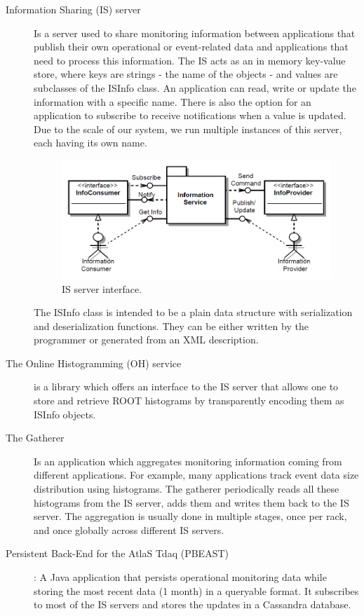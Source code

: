 \begin{description}
\item[Information Sharing (IS) server \citep{kolosinformation}]  Is a server used to share monitoring information between applications that publish their own operational or event-related data and applications that need to process this information. The IS acts as an in memory key-value store, where keys are strings - the name of the objects - and values are subclasses of the ISInfo class. An application can read, write or update the information with a specific name. There is also the option for an application to subscribe to receive notifications when a value is updated. Due to the scale of our system, we run multiple instances of this server, each having its own name.

\begin{figure}[ht!]
\centering
\includegraphics[scale=0.44]{Images/IS.png}
\caption{IS server interface.}
\end{figure}


The ISInfo class is intended to be a plain data structure with serialization and deserialization functions. They can be either written by the programmer or generated from an XML description.

\item[The Online Histogramming (OH) service \citep{kolosoh}] is a library which offers an interface to the IS server that allows one to store and retrieve ROOT histograms by transparently encoding them as ISInfo objects.

\item[The Gatherer \citep{renkel2010gatherer}] Is an application which aggregates monitoring information coming from different applications. For example, many applications track event data size distribution using histograms. The gatherer periodically reads all these histograms from the IS server, adds them and writes them back to the IS server. The aggregation is usually done in multiple stages, once per rack, and once globally across different IS servers. 

\item[Persistent Back-End for the AtlaS Tdaq (PBEAST) \citep{sicoe2012persistent}]: A Java application that persists operational monitoring data while storing the most recent data (1 month) in a queryable format. It subscribes to most of the IS servers and stores the updates in a Cassandra database.

\end{description}

